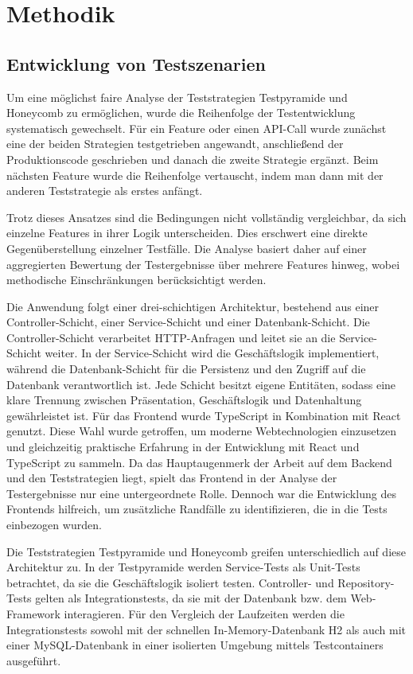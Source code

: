 \section{Methodik}

\subsection{Entwicklung von Testszenarien}

Um eine möglichst faire Analyse der Teststrategien Testpyramide und Honeycomb zu ermöglichen, wurde die Reihenfolge der Testentwicklung systematisch gewechselt. Für ein Feature oder einen API-Call wurde zunächst eine der beiden Strategien testgetrieben angewandt, anschließend der Produktionscode geschrieben und danach die zweite Strategie ergänzt. Beim nächsten Feature wurde die Reihenfolge vertauscht, indem man dann mit der anderen Teststrategie als erstes anfängt.

Trotz dieses Ansatzes sind die Bedingungen nicht vollständig vergleichbar, da sich einzelne Features in ihrer Logik unterscheiden. Dies erschwert eine direkte Gegenüberstellung einzelner Testfälle. Die Analyse basiert daher auf einer aggregierten Bewertung der Testergebnisse über mehrere Features hinweg, wobei methodische Einschränkungen berücksichtigt werden.

Die Anwendung folgt einer drei-schichtigen Architektur, bestehend aus einer Controller-Schicht, einer Service-Schicht und einer Datenbank-Schicht. Die Controller-Schicht verarbeitet HTTP-Anfragen und leitet sie an die Service-Schicht weiter. In der Service-Schicht wird die Geschäftslogik implementiert, während die Datenbank-Schicht für die Persistenz und den Zugriff auf die Datenbank verantwortlich ist. Jede Schicht besitzt eigene Entitäten, sodass eine klare Trennung zwischen Präsentation, Geschäftslogik und Datenhaltung gewährleistet ist. Für das Frontend wurde TypeScript in Kombination mit React genutzt. Diese Wahl wurde getroffen, um moderne Webtechnologien einzusetzen und gleichzeitig praktische Erfahrung in der Entwicklung mit React und TypeScript zu sammeln. Da das Hauptaugenmerk der Arbeit auf dem Backend und den Teststrategien liegt, spielt das Frontend in der Analyse der Testergebnisse nur eine untergeordnete Rolle. Dennoch war die Entwicklung des Frontends hilfreich, um zusätzliche Randfälle zu identifizieren, die in die Tests einbezogen wurden.

Die Teststrategien Testpyramide und Honeycomb greifen unterschiedlich auf diese Architektur zu. In der Testpyramide werden Service-Tests als Unit-Tests betrachtet, da sie die Geschäftslogik isoliert testen. Controller- und Repository-Tests gelten als Integrationstests, da sie mit der Datenbank bzw. dem Web-Framework interagieren. Für den Vergleich der Laufzeiten werden die Integrationstests sowohl mit der schnellen In-Memory-Datenbank H2 als auch mit einer MySQL-Datenbank in einer isolierten Umgebung mittels Testcontainers ausgeführt. 

